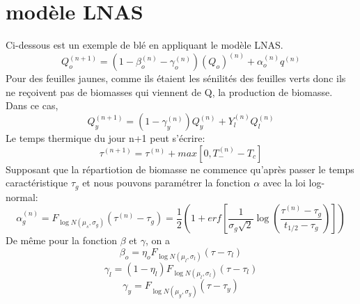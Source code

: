 \section{modèle LNAS}
Ci-dessous est un exemple de blé en appliquant le modèle LNAS.
\[ {Q_o^{(n+1)}} = (1-\beta_o^{(n)}-\gamma_o^{(n)} )(Q_o)^{(n)} +\alpha_o^{(n)}q^{(n)} \]
Pour des feuilles jaunes, comme ils étaient les sénilités des feuilles verts donc ils ne reçoivent pas de biomasses qui viennent de Q, la production de biomasse. Dans ce cas, 
\[ {Q_y^{(n+1)}}=(1-\gamma_y^{(n)})Q_y^{(n)}+Y_l^{(n)}Q_l^{(n)} \]
Le temps thermique du jour n+1 peut s'écrire:
\[ {\tau}^{(n+1)}=\tau^{(n)}+max[0,T_-^{(n)}-T_c] \]
Supposant que la répartiotion de biomasse ne commence qu'après passer le temps caractéristique $\tau_g$ et  nous pouvons paramétrer la fonction $\alpha$ avec la loi log-normal:
\[ {\alpha_g^{(n)}}=F_{\log N(\mu_s,\sigma_g)}(\tau^{(n)}-\tau_g)=\frac{1}{2} (1+erf[\frac{1}{\sigma_g \sqrt{2}}\log (\frac{\tau^{(n)}-\tau_g}{t_{1/2}-\tau_g})]) \]
De même pour la fonction $\beta $ et $\gamma$, on a
\[ {\beta_o}=\eta_o F_{\log N(\mu_l, \sigma_l)}(\tau-\tau_l) \]
\[ {\gamma_l}=(1-\eta_l)F_{\log N(\mu_l, \sigma_l)}(\tau-\tau_l) \]
\[ {\gamma_y}=F_{\log N(\mu_y, \sigma_y)}(\tau-\tau_y) \]

